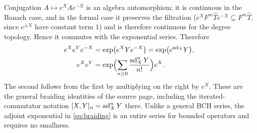 Conjugation $A\mapsto e^XAe^{-X}$ is an algebra automorphism; it is
continuous in the Banach case, and in the formal case it preserves the
filtration ($e^XF^m\widehat Te^{-X}\subseteq F^m\widehat T$, since $e^{\pm X}$
have constant term $1$) and is therefore continuous for the degree
topology. Hence it commutes with the exponential series. Therefore
\begin{align}
 e^Xe^Ye^{-X}&=\exp\bigl(e^XYe^{-X}\bigr)=\exp\bigl(e^{\operatorname{ad}_X}Y\bigr),\label{eq:conjexp}\\
 e^Xe^Y&=\exp\Bigl(\sum_{n\geq0}\frac{\operatorname{ad}_X^nY}{n!}\Bigr)e^X.\label{eq:braiding}
\end{align}
The second follows from the first by multiplying on the right by $e^X$. These
are the general braiding identities of the source page, including the
iterated-commutator notation $[X,Y]_n=\operatorname{ad}_X^nY$ there. Unlike a general BCH
series, the adjoint exponential in \eqref{eq:braiding} is an entire series
for bounded operators and requires no smallness.


